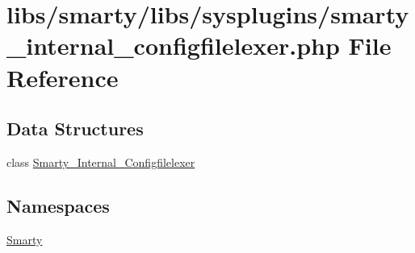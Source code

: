 \hypertarget{smarty__internal__configfilelexer_8php}{}\section{libs/smarty/libs/sysplugins/smarty\+\_\+internal\+\_\+configfilelexer.php File Reference}
\label{smarty__internal__configfilelexer_8php}
\subsection*{Data Structures}
\begin{DoxyCompactItemize}
\item 
class \hyperlink{class_smarty___internal___configfilelexer}{Smarty\+\_\+\+Internal\+\_\+\+Configfilelexer}
\end{DoxyCompactItemize}
\subsection*{Namespaces}
\begin{DoxyCompactItemize}
\item 
 \hyperlink{namespace_smarty}{Smarty}
\end{DoxyCompactItemize}
